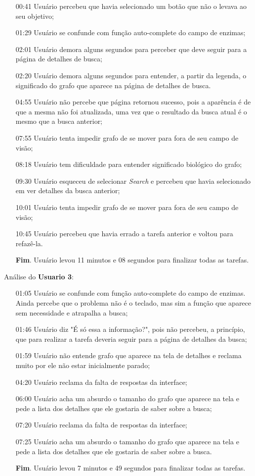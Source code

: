 \begin{itemize}
\item[00:41] Usuário percebeu que havia selecionado um botão que não o levava ao seu objetivo;
\item[01:29] Usuário se confunde com função auto-complete do campo de enzimas;
\item[02:01] Usuário demora alguns segundos para perceber que deve seguir para a página de detalhes de busca;
\item[02:20] Usuário demora alguns segundos para entender, a partir da legenda, o significado do grafo que aparece na página de detalhes de busca.
\item[04:55] Usuário não percebe que página retornou sucesso, pois a aparência é de que a mesma não foi atualizada, uma vez que o resultado da busca atual é o mesmo que a busca anterior;
\item[07:55] Usuário tenta impedir grafo de se mover para fora de seu campo de visão;
\item[08:18] Usuário tem dificuldade para entender significado biológico do grafo;
\item[09:30] Usuário esqueceu de selecionar \textit{Search} e percebeu que havia selecionado em ver detalhes da busca anterior;
\item[10:01] Usuário tenta impedir grafo de se mover para fora de seu campo de visão;
\item[10:45] Usuário percebeu que havia errado a tarefa anterior e voltou para refazê-la.
\item[ ] \textbf{Fim}. Usuário levou 11 minutos e 08 segundos para finalizar todas as tarefas.
\end{itemize}

\vspace{10mm}
\indent Análise do \textbf{Usuario 3}:

\begin{itemize}
\item[01:05] Usuário se confunde com função auto-complete do campo de enzimas. Ainda percebe que o problema não é o teclado, mas sim a função que aparece sem necessidade e atrapalha a busca;
\item[01:46] Usuário diz "É só essa a informação?", pois não percebeu, a princípio, que para realizar a tarefa deveria seguir para a página de detalhes da busca;
\item[01:59] Usuário não entende grafo que aparece na tela de detalhes e reclama muito por ele não estar inicialmente parado;
\item[04:20] Usuário reclama da falta de respostas da interface;
\item[06:00] Usuário acha um absurdo o tamanho do grafo que aparece na tela e pede a lista dos detalhes que ele gostaria de saber sobre a busca;
\item[07:20] Usuário reclama da falta de respostas da interface;
\item[07:25] Usuário acha um absurdo o tamanho do grafo que aparece na tela e pede a lista dos detalhes que ele gostaria de saber sobre a busca.
\item[ ] \textbf{Fim}. Usuário levou 7 minutos e 49 segundos para finalizar todas as tarefas.
\end{itemize}


